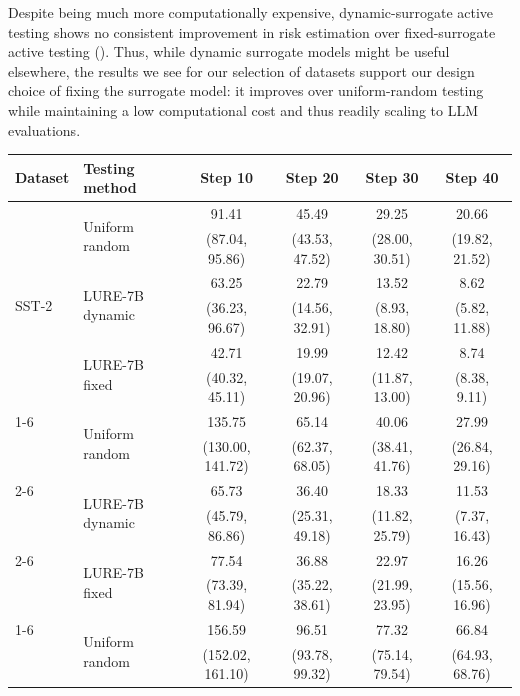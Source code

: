Despite being much more computationally expensive, dynamic-surrogate active testing shows no consistent improvement in risk estimation over fixed-surrogate active testing ().
Thus, while dynamic surrogate models might be useful elsewhere, the results we see for our selection of datasets support our design choice of fixing the surrogate model: it improves over uniform-random testing while maintaining a low computational cost and thus readily scaling to LLM evaluations.


\begin{table}[h]
    \centering
    \small
    \begin{tabular}{l l c c c c}
        \toprule
        Dataset & Testing method & Step 10 & Step 20 & Step 30 & Step 40 \\
        \midrule
        \multirow{6}{*}{SST-2}& \multirow{2}{*}{Uniform random} & 91.41 &45.49  & 29.25 	& 20.66 \\
        &&(87.04, 95.86)	& (43.53, 47.52)	& (28.00, 30.51)& (19.82, 21.52)\\
        \cline{2-6}
        &\multirow{2}{*}{LURE-7B dynamic} & 63.25  &	22.79 	& 13.52 	&8.62 \\
        &&(36.23, 96.67)&(14.56, 32.91)&(8.93, 18.80)&(5.82, 11.88)\\
        \cline{2-6}
        & \multirow{2}{*}{LURE-7B fixed} & 42.71 	&19.99 	&12.42 	&8.74 \\
        &&(40.32, 45.11)&(19.07, 20.96)&(11.87, 13.00)&(8.38, 9.11)\\
        \cline{1-6}
        \multirow{6}{*}{FPB}& \multirow{2}{*}{Uniform random} & 135.75 &	65.14 &	40.06 &	27.99 \\
        &&(130.00, 141.72)&(62.37, 68.05)&(38.41, 41.76)&(26.84, 29.16)\\
        \cline{2-6}
        & \multirow{2}{*}{LURE-7B dynamic} & 65.73 &	36.40 	&18.33 	&11.53 \\
        &&(45.79, 86.86)&(25.31, 49.18)&(11.82, 25.79)&(7.37, 16.43)\\
        \cline{2-6}
        & \multirow{2}{*}{LURE-7B fixed} & 77.54 	&36.88 	&22.97	&16.26 \\
        &&(73.39, 81.94)&(35.22, 38.61)& (21.99, 23.95)&(15.56, 16.96)\\
        \cline{1-6}
        \multirow{6}{*}{HS}& \multirow{2}{*}{Uniform random} & 156.59 &	96.51  &	77.32 &	66.84 \\
        &&(152.02, 161.10)&(93.78, 99.32)&(75.14, 79.54)&(64.93, 68.76)\\

\end{tabular}
\end{table}
